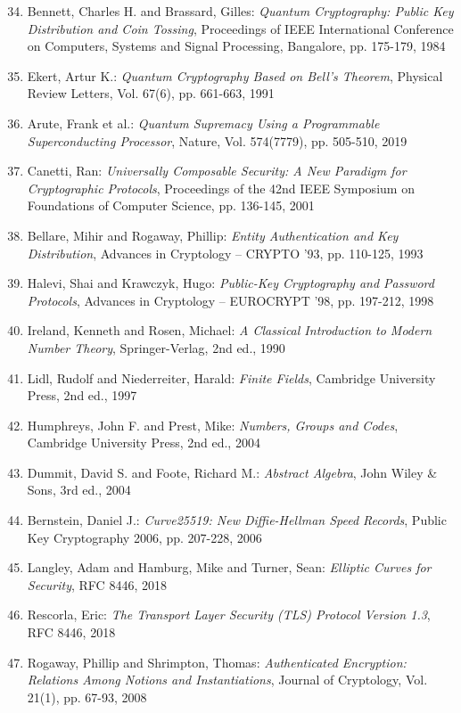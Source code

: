 ﻿\documentclass[12pt,a4paper]{article}
\begin{document}
	\begin{enumerate}
		\setcounter{enumi}{33}
		\item Bennett, Charles H. and Brassard, Gilles: \textit{Quantum Cryptography: Public Key Distribution and Coin Tossing}, Proceedings of IEEE International Conference on Computers, Systems and Signal Processing, Bangalore, pp. 175-179, 1984
		\item Ekert, Artur K.: \textit{Quantum Cryptography Based on Bell's Theorem}, Physical Review Letters, Vol. 67(6), pp. 661-663, 1991
		\item Arute, Frank et al.: \textit{Quantum Supremacy Using a Programmable Superconducting Processor}, Nature, Vol. 574(7779), pp. 505-510, 2019
	\end{enumerate}
	
	\begin{enumerate}
		\setcounter{enumi}{36}
		\item Canetti, Ran: \textit{Universally Composable Security: A New Paradigm for Cryptographic Protocols}, Proceedings of the 42nd IEEE Symposium on Foundations of Computer Science, pp. 136-145, 2001
		\item Bellare, Mihir and Rogaway, Phillip: \textit{Entity Authentication and Key Distribution}, Advances in Cryptology -- CRYPTO '93, pp. 110-125, 1993
		\item Halevi, Shai and Krawczyk, Hugo: \textit{Public-Key Cryptography and Password Protocols}, Advances in Cryptology -- EUROCRYPT '98, pp. 197-212, 1998
	\end{enumerate}
	
	\begin{enumerate}
		\setcounter{enumi}{39}
		\item Ireland, Kenneth and Rosen, Michael: \textit{A Classical Introduction to Modern Number Theory}, Springer-Verlag, 2nd ed., 1990
		\item Lidl, Rudolf and Niederreiter, Harald: \textit{Finite Fields}, Cambridge University Press, 2nd ed., 1997
		\item Humphreys, John F. and Prest, Mike: \textit{Numbers, Groups and Codes}, Cambridge University Press, 2nd ed., 2004
		\item Dummit, David S. and Foote, Richard M.: \textit{Abstract Algebra}, John Wiley \& Sons, 3rd ed., 2004
	\end{enumerate}
	
	\begin{enumerate}
		\setcounter{enumi}{43}
		\item Bernstein, Daniel J.: \textit{Curve25519: New Diffie-Hellman Speed Records}, Public Key Cryptography 2006, pp. 207-228, 2006
		\item Langley, Adam and Hamburg, Mike and Turner, Sean: \textit{Elliptic Curves for Security}, RFC 8446, 2018
		\item Rescorla, Eric: \textit{The Transport Layer Security (TLS) Protocol Version 1.3}, RFC 8446, 2018
		\item Rogaway, Phillip and Shrimpton, Thomas: \textit{Authenticated Encryption: Relations Among Notions and Instantiations}, Journal of Cryptology, Vol. 21(1), pp. 67-93, 2008
	\end{enumerate}
	
\end{document}
